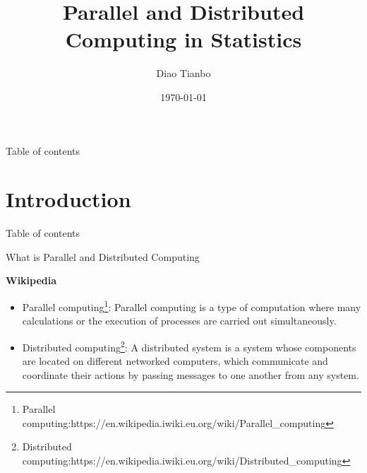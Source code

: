 \documentclass[10pt,aspectratio=169]{beamer}
\title{Parallel and Distributed Computing in Statistics}
\author{Diao Tianbo}
\institute[CCNU]{
School of Mathematics and Statistics\\
Central China Normal University}
\date{\today}
\begin{document}
\begin{sloppypar}
	
	
\begin{frame}
\titlepage
\end{frame}				%

\begin{frame}{Table of contents}
\tableofcontents
\end{frame}	             %

\section{Introduction}
\begin{frame}[shrink]{Table of contents}
        \tableofcontents[sectionstyle=show/shaded,subsectionstyle=show/shaded/hide]
 \end{frame}

\begin{frame}{What is Parallel and Distributed Computing} \par
	{\bf {Wikipedia}}
\begin{itemize}
	
	\item {\color{red}Parallel computing\footnote{Parallel computing:https://en.wikipedia.iwiki.eu.org/wiki/Parallel\_computing}}: Parallel computing is a type of computation where 	many calculations or the execution of processes are carried out simultaneously.
		\item {\color{red}Distributed computing\footnote{Distributed computing:https://en.wikipedia.iwiki.eu.org/wiki/Distributed\_computing}}:  A distributed system is a system whose components are located on different networked computers, which communicate and coordinate their actions by passing messages to one another from any system.
\end{itemize}
\end{frame}	


\end{sloppypar}
\end{document}
